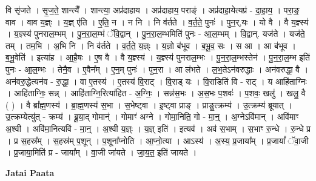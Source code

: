 \documentclass[17pt]{extarticle}
\begin{document}
वि सृ॑जते । सृ॒ज॒ते॒ शान्त्यै᳚ । शान्त्या॒ अप्र॑दाहाय । अप्र॑दाहाय॒ पराङ्॑ । अप्र॑दाहा॒येत्यप्र॑ - दा॒हा॒य॒ । परा॒ङ्॒ वाव । वाव य॒ज्ञ्ः । य॒ज्ञ् ए॑ति । ए॒ति॒ न । न नि । नि व॑र्तते । व॒र्त॒ते॒ पुनः॑ । पुन॒र्,यः । यो वै । वै य॒ज्ञ्स्य॑ । य॒ज्ञ्स्य॑ पुनराल॒म्भम् । पु॒न॒रा॒ल॒म्भं ॅवि॒द्वान् । पु॒न॒रा॒ल॒म्भमिति॑ पुनः - आ॒ल॒म्भम् । वि॒द्वान्. यज॑ते । यज॑ते॒ तम् । तम॒भि । अ॒भि नि । नि व॑र्तते । व॒र्त॒ते॒ य॒ज्ञ्ः । य॒ज्ञो ब॑भूव । ब॒भू॒व॒ सः । स आ । आ ब॑भूव । ब॒भू॒वेति॑ । इत्या॑ह । आ॒है॒षः । ए॒ष वै । वै य॒ज्ञ्स्य॑ । य॒ज्ञ्स्य॑ पुनराल॒म्भः । पु॒न॒रा॒ल॒म्भस्तेन॑ । पु॒न॒रा॒ल॒म्भ इति॑ पुनः - आ॒ल॒म्भः । तेनै॒व । ए॒वैन᳚म् । ए॒न॒म् पुनः॑ । पुन॒रा । आ ल॑भते । ल॒भ॒तेऽन॑वरुद्धाः । अन॑वरुद्धा॒ वै । अन॑वरु॒द्धेत्यन॑व - रु॒द्धा॒ । वा ए॒तस्य॑ । ए॒तस्य॑ वि॒राट् । वि॒राड् यः । वि॒राडिति॑ वि - राट् । य आहि॑ताग्निः । आहि॑ताग्निः॒ सन्न् । आहि॑ताग्नि॒रित्या॑हित - अ॒ग्निः॒ । सन्न॑स॒भः । अ॒स॒भः प॒शवः॑ । प॒शवः॒ खलु॑ । खलु॒ वै ( ) । वै ब्रा᳚ह्म॒णस्य॑ । ब्रा॒ह्म॒णस्य॑ स॒भा । स॒भेष्ट्वा । इ॒ष्ट्वा प्राङ् । प्राङु॒त्क्रम्य॑ । उ॒त्क्रम्य॑ ब्रूयात् । उ॒त्क्रम्येत्यु॑त् - क्रम्य॑ । ब्रू॒या॒द् गोमान्॑ । गोमाꣳ॑ अग्ने । गोमा॒निति॒ गो - मा॒न्॒ । अ॒ग्नेऽवि॑मान् । अवि॑माꣳ अ॒श्वी । अवि॑मा॒नित्यवि॑ - मा॒न्॒ । अ॒श्वी य॒ज्ञ्ः । य॒ज्ञ् इति॑ । इत्यव॑ । अव॑ स॒भाम् । स॒भाꣳ रु॒न्धे । रु॒न्धे प्र । प्र स॒हस्र᳚म् । स॒हस्र॑म् प॒शून् । प॒शूना᳚प्नोति । आ॒प्नो॒त्या । आऽस्य॑ । अ॒स्य॒ प्र॒जाया᳚म् । प्र॒जायां᳚ ॅवा॒जी । प्र॒जाया॒मिति॑ प्र - जाया᳚म् । वा॒जी जा॑यते । जा॒य॒त॒ इति॑ जायते । \newline

\textbf{Jatai Paata} \newline
\end{document}
